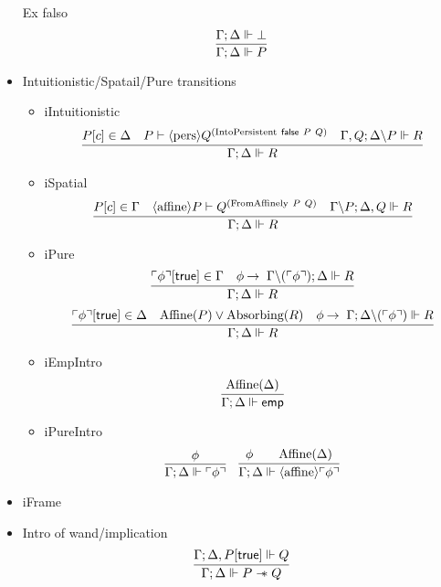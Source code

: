 \begin{itemize}
  Ex falso
  $$
  \infer{\entailsD P}
        {\entailsD \bot}
  $$
\item Intuitionistic/Spatail/Pure transitions
  \begin{itemize}
  \item iIntuitionistic
    $$
    \infer{\entailsD R}
          {P[c] \in \SpatD &
           P \vdash \pers Q^{(\text{IntoPersistent}\ \false\ P\ Q)} &
           \entails {\IntuD, Q} {\SpatD \backslash P} {R}
         }
    $$
  \item iSpatial
    $$
    \infer{\entailsD R}
          {P[c] \in \IntuD &
           \affine P \vdash Q^{(\text{FromAffinely}\ P\ Q)} &
           \entails {\IntuD \backslash P} {\SpatD, Q} {R}
         }
    $$
  \item iPure
    $$
    \infer{\entailsD R}
          {\pure{\phi}[\true] \in \IntuD &
           \phi \imp \entails {\IntuD \backslash (\pure{\phi})} {\SpatD} {R}
         }
    $$
    $$
    \infer{\entailsD R}
          {\pure{\phi}[\true] \in \SpatD &
           \Affine{P} \vee \Absorbing{R} &
           \phi \imp \entails {\IntuD} {\SpatD \backslash (\pure{\phi})} {R}
         }
    $$
  \item iEmpIntro
    $$
    \infer{\entailsD \emp}
          {\Affine{\SpatD}}
    $$
  \item iPureIntro
    \begin{equation}
    \infer{\entailsD {\pure \phi}}
          {\phi}
    \quad
    \infer{\entailsD {\affine \pure \phi }}
          {\phi & &
           \Affine{\SpatD}
          }
    \end{equation}
  \end{itemize}
\item iFrame
\item Intro of wand/implication
  $$
  \infer{\entailsD P \wand Q}
        {\entails {\IntuD} {\SpatD , P[\true]} {Q}}
  $$


\end{itemize}
